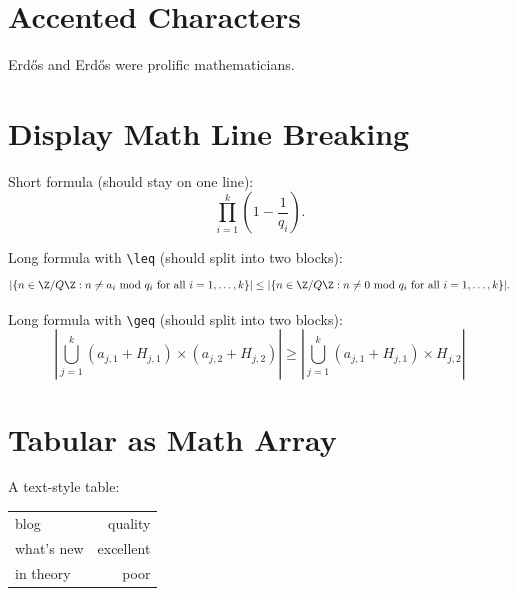 %



\section{Accented Characters}


Erd\H{o}s and Erd\H os were prolific mathematicians.

\section{Display Math Line Breaking}


Short formula (should stay on one line):
$$\prod_{i=1}^k \left(1 - \frac{1}{q_i}\right).$$

Long formula with \verb|\leq| (should split into two blocks):
$$|\{ n \in \Z/Q\Z: n \neq a_i \hbox{ mod } q_i \hbox{ for all } i=1,\ldots,k \}| \leq |\{ n \in \Z/Q\Z: n \neq 0 \hbox{ mod } q_i \hbox{ for all } i=1,\ldots,k \}|.$$

Long formula with \verb|\geq| (should split into two blocks):
$$ |\bigcup_{j=1}^k (a_{j,1} + H_{j,1}) \times (a_{j,2} + H_{j,2})| \geq |\bigcup_{j=1}^k (a_{j,1} + H_{j,1}) \times H_{j,2}|$$

\section{Tabular as Math Array}


A text-style table:

\begin{tabular}{lr}
blog & quality\\
what's new & excellent\\
in theory & poor
\end{tabular}

